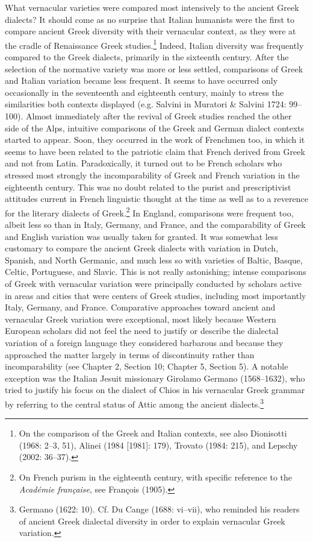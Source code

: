 \documentclass[12pt]{article}
\newenvironment{styleStandard}{\renewcommand\baselinestretch{1.25}\setlength\leftskip{0in}\setlength\rightskip{0in}\setlength\parindent{0.1972in}\setlength\parfillskip{0pt plus 1fil}\setlength\parskip{0in plus 1pt}\writerlistparindent\writerlistleftskip\leavevmode\normalfont\normalsize\writerlistlabel\ignorespaces}{\unskip\vspace{0in plus 1pt}\par}
\newcommand\writerlistleftskip{}
\newcommand\writerlistparindent{}
\newcommand\writerlistlabel{}
\begin{document}
\begin{styleStandard}
What vernacular varieties were compared most intensively to the ancient Greek dialects? It should come as no surprise that Italian humanists were the first to compare ancient Greek diversity with their vernacular context, as they were at the cradle of Renaissance Greek studies.\footnote{ On the comparison of the Greek and Italian contexts, see also Dionisotti (1968: 2–3, 51), Alinei (1984 [1981]: 179), Trovato (1984: 215), and Lepschy (2002: 36–37).} Indeed, Italian diversity was frequently compared to the Greek dialects, primarily in the sixteenth century. After the selection of the normative variety was more or less settled, comparisons of Greek and Italian variation became less frequent. It seems to have occurred only occasionally in the seventeenth and eighteenth century, mainly to stress the similarities both contexts displayed (e.g. Salvini in Muratori \& Salvini 1724: 99–100). Almost immediately after the revival of Greek studies reached the other side of the Alps, intuitive comparisons of the Greek and German dialect contexts started to appear. Soon, they occurred in the work of Frenchmen too, in which it seems to have been related to the patriotic claim that French derived from Greek and not from Latin. Paradoxically, it turned out to be French scholars who stressed most strongly the incomparability of Greek and French variation in the eighteenth century. This was no doubt related to the purist and prescriptivist attitudes current in French linguistic thought at the time as well as to a reverence for the literary dialects of Greek.\footnote{ On French purism in the eighteenth century, with specific reference to the \textit{Académie française}, see François (1905).} In England, comparisons were frequent too, albeit less so than in Italy, Germany, and France, and the comparability of Greek and English variation was usually taken for granted. It was somewhat less customary to compare the ancient Greek dialects with variation in Dutch, Spanish, and North Germanic, and much less so with varieties of Baltic, Basque, Celtic, Portuguese, and Slavic. This is not really astonishing; intense comparisons of Greek with vernacular variation were principally conducted by scholars active in areas and cities that were centers of Greek studies, including most importantly Italy, Germany, and France. Comparative approaches toward ancient and vernacular Greek variation were exceptional, most likely because Western European scholars did not feel the need to justify or describe the dialectal variation of a foreign language they considered barbarous and because they approached the matter largely in terms of discontinuity rather than incomparability (see Chapter 2, Section 10; Chapter 5, Section 5). A notable exception was the Italian Jesuit missionary Girolamo Germano (1568–1632), who tried to justify his focus on the dialect of Chios in his vernacular Greek grammar by referring to the central status of Attic among the ancient dialects.\footnote{ Germano (1622: 10). Cf. Du Cange (1688: vi–vii), who reminded his readers of ancient Greek dialectal diversity in order to explain vernacular Greek variation.}
\end{styleStandard}
\end{document}
